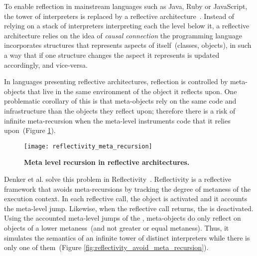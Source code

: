 To enable reflection in mainstream languages such as Java, Ruby or JavaScript, the tower of interpreters is replaced by a reflective architecture~\cite{Maes87a}. Instead of relying on a stack of interpreters interpreting each the level below it, a reflective architecture relies on the idea of \emph{causal connection} \ie the programming language incorporates structures that represents aspects of itself~(\eg classes, objects), in such a way that if one structure changes the aspect it represents is updated accordingly, and vice-versa.


In languages presenting reflective architectures, reflection is controlled by meta-objects that live in the same environment of the object it reflects upon.
One problematic corollary of this is that meta-objects rely on the same code and infrastructure than the objects they reflect upon; therefore there is a risk of infinite meta-recursion when the meta-level instruments code that it relies upon~(Figure \ref{fig:reflectivity_meta_recursion}).

\begin{figure}[ht]
\begin{center}
\texttt{[image: reflectivity\_meta\_recursion]}
\caption{\textbf{Meta level recursion in reflective architectures.}\label{fig:reflectivity_meta_recursion}
 }
\end{center}
\end{figure}

Denker et al. solve this problem in Reflectivity~\cite{Denk08b}. Reflectivity is a reflective framework that avoids meta-recursions by tracking the degree of metaness of the execution context. In each reflective call, the  object is activated and it accounts the meta-level jump. Likewise, when the reflective call returns, the  is deactivated. Using the accounted meta-level jumps of the , meta-objects do only reflect on objects of a lower metaness~(and not greater or equal metaness). Thus, it simulates the semantics of an infinite tower of distinct interpreters while there is only one of them~(Figure \ref{fig:reflectivity_avoid_meta_recursion}).

